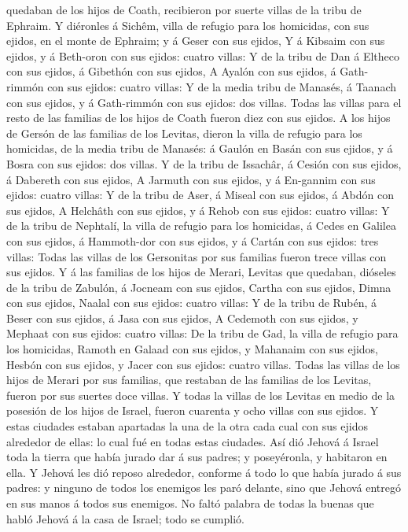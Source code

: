 quedaban de los hijos de Coath, recibieron por suerte villas de la tribu
de Ephraim.  Y diéronles á Sichêm, villa de refugio para
los homicidas, con sus ejidos, en el monte de Ephraim; y á Geser con sus
ejidos,  Y á Kibsaim con sus ejidos, y á Beth-oron con sus
ejidos: cuatro villas:  Y de la tribu de Dan á Eltheco con
sus ejidos, á Gibethón con sus ejidos,  A Ayalón con sus
ejidos, á Gath-rimmón con sus ejidos: cuatro villas:  Y de
la media tribu de Manasés, á Taanach con sus ejidos, y á Gath-rimmón con
sus ejidos: dos villas.  Todas las villas para el resto de
las familias de los hijos de Coath fueron diez con sus ejidos.
 A los hijos de Gersón de las familias de los Levitas,
dieron la villa de refugio para los homicidas, de la media tribu de
Manasés: á Gaulón en Basán con sus ejidos, y á Bosra con sus ejidos: dos
villas.  Y de la tribu de Issachâr, á Cesión con sus
ejidos, á Dabereth con sus ejidos,  A Jarmuth con sus
ejidos, y á En-gannim con sus ejidos: cuatro villas:  Y de
la tribu de Aser, á Miseal con sus ejidos, á Abdón con sus ejidos,
 A Helchâth con sus ejidos, y á Rehob con sus ejidos:
cuatro villas:  Y de la tribu de Nephtalí, la villa de
refugio para los homicidas, á Cedes en Galilea con sus ejidos, á
Hammoth-dor con sus ejidos, y á Cartán con sus ejidos: tres villas:
 Todas las villas de los Gersonitas por sus familias fueron
trece villas con sus ejidos.  Y á las familias de los hijos
de Merari, Levitas que quedaban, dióseles de la tribu de Zabulón, á
Jocneam con sus ejidos, Cartha con sus ejidos,  Dimna con
sus ejidos, Naalal con sus ejidos: cuatro villas:  Y de la
tribu de Rubén, á Beser con sus ejidos, á Jasa con sus ejidos,
 A Cedemoth con sus ejidos, y Mephaat con sus ejidos:
cuatro villas:  De la tribu de Gad, la villa de refugio
para los homicidas, Ramoth en Galaad con sus ejidos, y Mahanaim con sus
ejidos,  Hesbón con sus ejidos, y Jacer con sus ejidos:
cuatro villas.  Todas las villas de los hijos de Merari por
sus familias, que restaban de las familias de los Levitas, fueron por
sus suertes doce villas.  Y todas la villas de los Levitas
en medio de la posesión de los hijos de Israel, fueron cuarenta y ocho
villas con sus ejidos.  Y estas ciudades estaban apartadas
la una de la otra cada cual con sus ejidos alrededor de ellas: lo cual
fué en todas estas ciudades.  Así dió Jehová á Israel toda
la tierra que había jurado dar á sus padres; y poseyéronla, y habitaron
en ella.  Y Jehová les dió reposo alrededor, conforme á
todo lo que había jurado á sus padres: y ninguno de todos los enemigos
les paró delante, sino que Jehová entregó en sus manos á todos sus
enemigos.  No faltó palabra de todas la buenas que habló
Jehová á la casa de Israel; todo se cumplió.

